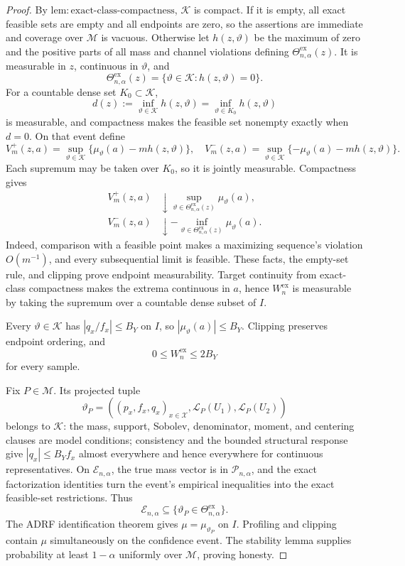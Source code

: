 \documentclass{article}
\begin{document}
\begin{proof}
By \(\mathrm{lem{:}exact\text{-}class\text{-}compactness}\), \(\mathscr K\) is compact. If it is empty, all exact feasible sets are empty and all endpoints are zero, so the assertions are immediate and coverage over \(\mathcal M\) is vacuous. Otherwise let \(h(z,\vartheta)\) be the maximum of zero and the positive parts of all mass and channel violations defining \(\Theta^{\mathrm{ex}}_{n,\alpha}(z)\). It is measurable in \(z\), continuous in \(\vartheta\), and
\[
 \Theta^{\mathrm{ex}}_{n,\alpha}(z)=\{\vartheta\in\mathscr K:h(z,\vartheta)=0\}.
\]
For a countable dense set \(K_0\subset\mathscr K\),
\[
 d(z):=\inf_{\vartheta\in\mathscr K}h(z,\vartheta)
 =\inf_{\vartheta\in K_0}h(z,\vartheta)
\]
is measurable, and compactness makes the feasible set nonempty exactly when \(d=0\). On that event define
\[
 V_m^+(z,a)=\sup_{\vartheta\in\mathscr K}\{\mu_\vartheta(a)-mh(z,\vartheta)\},
 \quad
 V_m^-(z,a)=\sup_{\vartheta\in\mathscr K}\{-\mu_\vartheta(a)-mh(z,\vartheta)\}.
\]
Each supremum may be taken over \(K_0\), so it is jointly measurable. Compactness gives
\[
 \begin{aligned}
 V_m^+(z,a)&\downarrow\sup_{\vartheta\in\Theta^{\mathrm{ex}}_{n,\alpha}(z)}\mu_\vartheta(a),\\
 V_m^-(z,a)&\downarrow-\inf_{\vartheta\in\Theta^{\mathrm{ex}}_{n,\alpha}(z)}\mu_\vartheta(a).
 \end{aligned}
\]
Indeed, comparison with a feasible point makes a maximizing sequence's violation \(O(m^{-1})\), and every subsequential limit is feasible. These facts, the empty-set rule, and clipping prove endpoint measurability. Target continuity from exact-class compactness makes the extrema continuous in \(a\), hence \(W_n^{\mathrm{ex}}\) is measurable by taking the supremum over a countable dense subset of \(I\).

Every \(\vartheta\in\mathscr K\) has \(|q_x/f_x|\le B_Y\) on \(I\), so \(|\mu_\vartheta(a)|\le B_Y\). Clipping preserves endpoint ordering, and
\[
 0\le W_n^{\mathrm{ex}}\le2B_Y
\]
for every sample.

Fix \(P\in\mathcal M\). Its projected tuple
\[
 \vartheta_P=((p_x,f_x,q_x)_{x\in\mathcal X},\mathcal L_P(U_1),\mathcal L_P(U_2))
\]
belongs to \(\mathscr K\): the mass, support, Sobolev, denominator, moment, and centering clauses are model conditions; consistency and the bounded structural response give \(|q_x|\le B_Yf_x\) almost everywhere and hence everywhere for continuous representatives. On \(\mathcal E_{n,\alpha}\), the true mass vector is in \(\mathcal P_{n,\alpha}\), and the exact factorization identities turn the event's empirical inequalities into the exact feasible-set restrictions. Thus
\[
 \mathcal E_{n,\alpha}\subseteq\{\vartheta_P\in\Theta^{\mathrm{ex}}_{n,\alpha}\}.
\]
The ADRF identification theorem gives \(\mu=\mu_{\vartheta_P}\) on \(I\). Profiling and clipping contain \(\mu\) simultaneously on the confidence event. The stability lemma supplies probability at least \(1-\alpha\) uniformly over \(\mathcal M\), proving honesty.


\end{proof}
\end{document}
